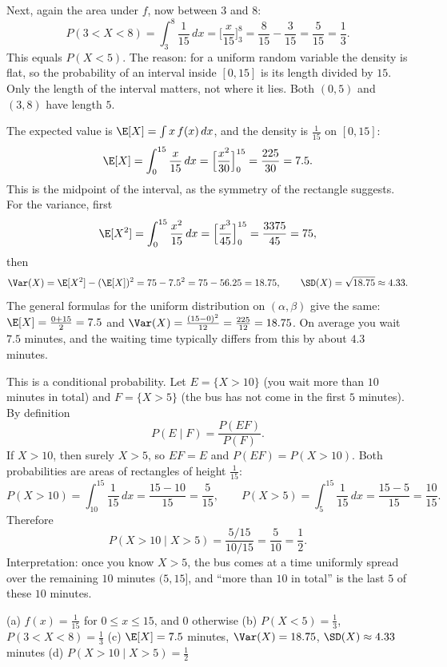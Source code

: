 \begin{solution}
	Next, again the area under $f$, now between $3$ and $8$:
	\[
		P(3<X<8)=\int_{3}^{8}\frac1{15}\,dx=\Big[\frac{x}{15}\Big]_{3}^{8}
		=\frac8{15}-\frac3{15}=\frac5{15}=\frac13 .
	\]
	This equals $P(X<5)$. The reason: for a uniform random variable
	the density is flat, so the probability of an interval inside $[0,15]$ is
	its length divided by $15$. Only the length of the interval matters, not
	where it lies. Both $(0,5)$ and $(3,8)$ have length $5$.

	 The expected value is $\E[X]=\int x\,f(x)\,dx$, and the
	density is $\frac1{15}$ on $[0,15]$:
	\[
		\E[X]=\int_0^{15}\frac{x}{15}\,dx=\Big[\frac{x^2}{30}\Big]_0^{15}
		=\frac{225}{30}=7.5 .
	\]
	This is the midpoint of the interval, as the symmetry of the rectangle
	suggests. For the variance, first
	\[
		\E[X^2]=\int_0^{15}\frac{x^2}{15}\,dx=\Big[\frac{x^3}{45}\Big]_0^{15}
		=\frac{3375}{45}=75,
	\]
	then
	\[
		\Var(X)=\E[X^2]-(\E[X])^2=75-7.5^2=75-56.25=18.75,\qquad
		\SD(X)=\sqrt{18.75}\approx4.33 .
	\]
	The general formulas for the uniform distribution on $(\alpha,\beta)$
	give the same: $\E[X]=\frac{0+15}{2}=7.5$ and
	$\Var(X)=\frac{(15-0)^2}{12}=\frac{225}{12}=18.75$. On average you wait
	$7.5$ minutes, and the waiting time typically differs from this by about
	$4.3$ minutes.

	 This is a conditional probability. Let $E=\{X>10\}$ (you wait
	more than $10$ minutes in total) and $F=\{X>5\}$ (the bus has not come in
	the first $5$ minutes). By definition
	\[
		P(E\mid F)=\frac{P(EF)}{P(F)} .
	\]
	If $X>10$, then surely $X>5$, so $EF=E$ and $P(EF)=P(X>10)$. Both
	probabilities are areas of rectangles of height $\frac1{15}$:
	\[
		P(X>10)=\int_{10}^{15}\frac1{15}\,dx=\frac{15-10}{15}=\frac5{15},
		\qquad
		P(X>5)=\int_{5}^{15}\frac1{15}\,dx=\frac{15-5}{15}=\frac{10}{15}.
	\]
	Therefore
	\[
		P(X>10\mid X>5)=\frac{5/15}{10/15}=\frac5{10}=\frac12 .
	\]
	Interpretation: once you know $X>5$, the bus comes at a time uniformly
	spread over the remaining $10$ minutes $(5,15]$, and ``more than $10$ in
	total'' is the last $5$ of these $10$ minutes.

	\begin{answer}
		(a) ${f(x)=\frac1{15}}$ for ${0\le x\le15}$, and $0$ otherwise \quad
		(b) ${P(X<5)=\frac13}$, ${P(3<X<8)=\frac13}$ \quad
		(c) $\E[X]=7.5$ minutes, $\Var(X)=18.75$, $\SD(X)\approx4.33$ minutes \quad
		(d) ${P(X>10\mid X>5)=\frac12}$
	\end{answer}
\end{solution}
